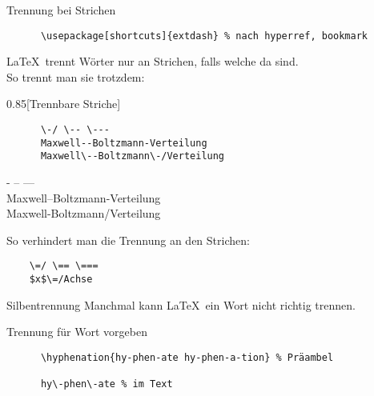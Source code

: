 \begin{frame}[fragile]{
  Trennung bei Strichen \hfill
}
  \begin{Packages}
    \begin{lstlisting}
      \usepackage[shortcuts]{extdash} % nach hyperref, bookmark
    \end{lstlisting}
  \end{Packages}

  \LaTeX\ trennt Wörter nur an Strichen, falls welche da sind.\\
  So trennt man sie trotzdem:
  \vspace{-0.5em}
  \begin{CodeExample}{0.85}[Trennbare Striche]
    \begin{lstlisting}
      \-/ \-- \---
      Maxwell--Boltzmann-Verteilung
      Maxwell\--Boltzmann\-/Verteilung
    \end{lstlisting}
  \CodeResult
    - -- --- \\
    Maxwell--Boltzmann-Verteilung \\
    Maxwell\--Boltzmann\-/Verteilung
  \end{CodeExample}

  \vspace{-7em}
  So verhindert man die Trennung an den Strichen:
  \begin{lstlisting}
    \=/ \== \===
    $x$\=/Achse
  \end{lstlisting}
\end{frame}

\begin{frame}[fragile]{Silbentrennung}
  Manchmal kann \LaTeX\ ein Wort nicht richtig trennen.
  \begin{block}{Trennung für Wort vorgeben}
    \begin{lstlisting}
      \hyphenation{hy-phen-ate hy-phen-a-tion} % Präambel

      hy\-phen\-ate % im Text
    \end{lstlisting}
  \end{block}
\end{frame}
